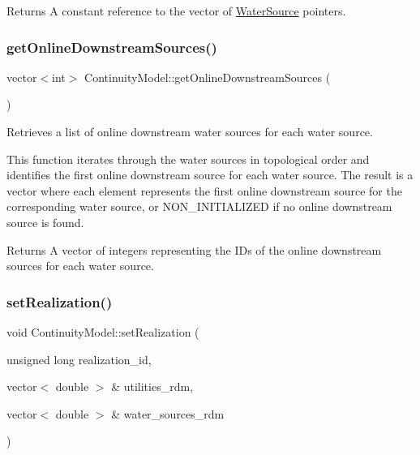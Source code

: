 \begin{DoxyReturn}{Returns}
A constant reference to the vector of {\ttfamily \mbox{\hyperlink{classWaterSource}{Water\+Source}}} pointers. 
\end{DoxyReturn}
\mbox{\label{classContinuityModel_a5682041c22910f1b2a79f30ba56a290d}} 
\subsubsection{\texorpdfstring{get\+Online\+Downstream\+Sources()}{getOnlineDownstreamSources()}}
{\footnotesize\ttfamily vector$<$int$>$ Continuity\+Model\+::get\+Online\+Downstream\+Sources (\begin{DoxyParamCaption}{ }\end{DoxyParamCaption})}



Retrieves a list of online downstream water sources for each water source. 

This function iterates through the water sources in topological order and identifies the first online downstream source for each water source. The result is a vector where each element represents the first online downstream source for the corresponding water source, or {\ttfamily N\+O\+N\+\_\+\+I\+N\+I\+T\+I\+A\+L\+I\+Z\+ED} if no online downstream source is found.

\begin{DoxyReturn}{Returns}
A vector of integers representing the I\+Ds of the online downstream sources for each water source. 
\end{DoxyReturn}
\mbox{\label{classContinuityModel_a47504c599955b8193ffab3bd0f328144}} 
\subsubsection{\texorpdfstring{set\+Realization()}{setRealization()}}
{\footnotesize\ttfamily void Continuity\+Model\+::set\+Realization (\begin{DoxyParamCaption}\item[{unsigned long}]{realization\+\_\+id,  }\item[{vector$<$ double $>$ \&}]{utilities\+\_\+rdm,  }\item[{vector$<$ double $>$ \&}]{water\+\_\+sources\+\_\+rdm }\end{DoxyParamCaption})}



